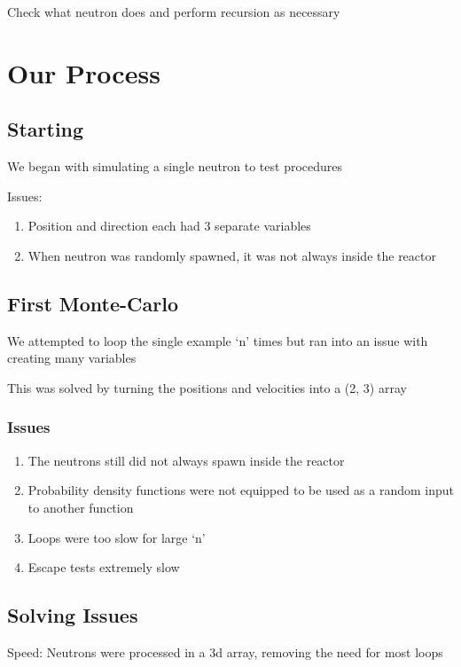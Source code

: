 \documentclass{notes}
\begin{document}
Check what neutron does and perform recursion as necessary

\section{Our Process}

\subsection{Starting}

We began with simulating a single neutron to test procedures

Issues:

\begin{enumerate}
    \item Position and direction each had 3 separate variables
    \item When neutron was randomly spawned, it was not always inside the reactor
\end{enumerate}

\subsection{First Monte-Carlo}

We attempted to loop the single example `n' times but ran into an issue with creating many variables

This was solved by turning the positions and velocities into a (2, 3) array

\subsubsection{Issues}

\begin{enumerate}
    \item The neutrons still did not always spawn inside the reactor
    \item Probability density functions were not equipped to be used as a random input to another function
    \item Loops were too slow for large `n'
    \item Escape tests extremely slow
\end{enumerate}

\subsection{Solving Issues}

Speed: Neutrons were processed in a 3d array, removing the need for most loops
\end{document}
